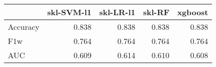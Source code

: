 \begin{tabular}{lrrrr}
\toprule
{} &  skl-SVM-l1 &  skl-LR-l1 &  skl-RF &  xgboost \\
\midrule
Accuracy &       0.838 &      0.838 &   0.838 &    0.838 \\
F1w      &       0.764 &      0.764 &   0.764 &    0.764 \\
AUC      &       0.609 &      0.614 &   0.610 &    0.608 \\
\bottomrule
\end{tabular}
